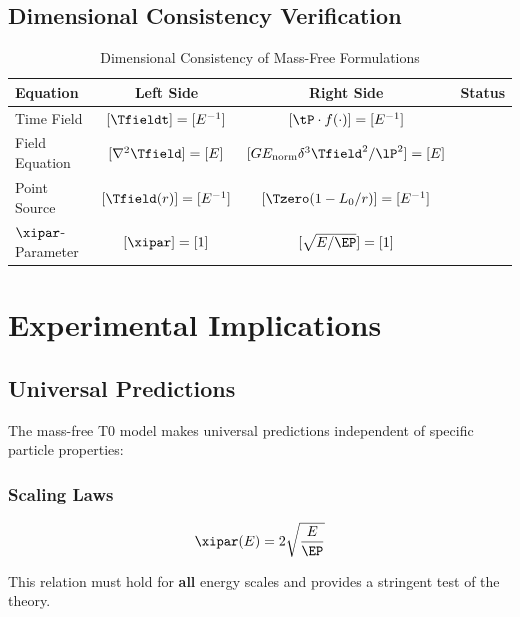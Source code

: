 	\subsection{Dimensional Consistency Verification}
	\label{subsec:dimensional_consistency}
	
	\begin{table}[htbp]
		\centering
		\begin{tabular}{lccl}
			\toprule
			\textbf{Equation} & \textbf{Left Side} & \textbf{Right Side} & \textbf{Status} \\
			\midrule
			Time Field & $[\Tfieldt] = [E^{-1}]$ & $[\tP \cdot f(\cdot)] = [E^{-1}]$ & \checkmark \\
			Field Equation & $[\nabla^2 \Tfield] = [E]$ & $[G E_{\text{norm}} \delta^3 \Tfield^2/\lP^2] = [E]$ & \checkmark \\
			Point Source & $[\Tfield(r)] = [E^{-1}]$ & $[\Tzero(1-L_0/r)] = [E^{-1}]$ & \checkmark \\
			$\xipar$-Parameter & $[\xipar] = [1]$ & $[\sqrt{E/\EP}] = [1]$ & \checkmark \\
			\bottomrule
		\end{tabular}
		\caption{Dimensional Consistency of Mass-Free Formulations}
	\end{table}
	
	\section{Experimental Implications}
	\label{sec:experimental_implications}
	
	\subsection{Universal Predictions}
	\label{subsec:universal_predictions}
	
	The mass-free T0 model makes universal predictions independent of specific particle properties:
	
	\subsubsection{Scaling Laws}
	
	\begin{equation}
		\xipar(E) = 2\sqrt{\frac{E}{\EP}}
		\label{eq:universal_scaling}
	\end{equation}
	
	This relation must hold for \textbf{all} energy scales and provides a stringent test of the theory.
	
